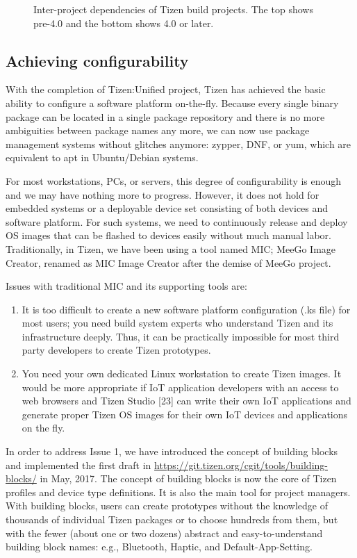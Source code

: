 \begin{figure}
\label{FIG_TZN_INTERPDEP}
\caption{Inter-project dependencies of Tizen build projects. The top shows pre-4.0 and the bottom shows 4.0 or later.}
\end{figure}

\subsection{Achieving configurability}

With the completion of Tizen:Unified project, Tizen has achieved the basic ability to configure a software platform on-the-fly. Because every single binary package can be located in a single package repository and there is no more ambiguities between package names any more, we can now use package management systems without glitches anymore: zypper, DNF, or yum, which are equivalent to apt in Ubuntu/Debian systems.


For most workstations, PCs, or servers, this degree of configurability is enough and we may have nothing more to progress. However, it does not hold for embedded systems or a deployable device set consisting of both devices and software platform. For such systems, we need to continuously release and deploy OS images that can be flashed to devices easily without much manual labor. Traditionally, in Tizen, we have been using a tool named MIC; MeeGo Image Creator, renamed as MIC Image Creator after the demise of MeeGo project.


Issues with traditional MIC and its supporting tools are:

\begin{enumerate}
\item It is too difficult to create a new software platform configuration (.ks file) for most users; you need build system experts who understand Tizen and its infrastructure deeply. Thus, it can be practically impossible for most third party developers to create Tizen prototypes.
\item You need your own dedicated Linux workstation to create Tizen images. It would be more appropriate if IoT application developers with an access to web browsers and Tizen Studio [23] can write their own IoT applications and generate proper Tizen OS images for their own IoT devices and applications on the fly.
\end{enumerate}

In order to address Issue 1, we have introduced the concept of building blocks and implemented the first draft in \url{https://git.tizen.org/cgit/tools/building-blocks/} in May, 2017. The concept of building blocks is now the core of Tizen profiles and device type definitions. It is also the main tool for project managers. With building blocks, users can create prototypes without the knowledge of thousands of individual Tizen packages or to choose hundreds from them, but with the fewer (about one or two dozens) abstract and easy-to-understand building block names: e.g., Bluetooth, Haptic, and Default-App-Setting.


